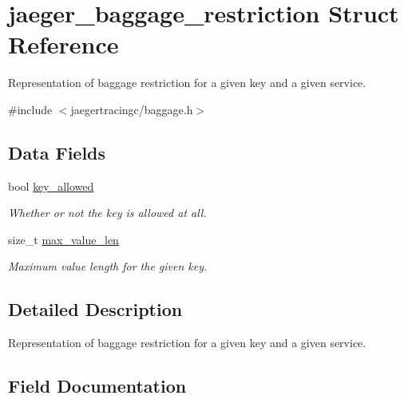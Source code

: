 \hypertarget{structjaeger__baggage__restriction}{}\section{jaeger\+\_\+baggage\+\_\+restriction Struct Reference}
\label{structjaeger__baggage__restriction}


Representation of baggage restriction for a given key and a given service.  




{\ttfamily \#include $<$jaegertracingc/baggage.\+h$>$}

\subsection*{Data Fields}
\begin{DoxyCompactItemize}
\item 
bool \mbox{\hyperlink{structjaeger__baggage__restriction_a0adda71667eefac438221ea727c5f1be}{key\+\_\+allowed}}
\begin{DoxyCompactList}\small\item\em Whether or not the key is allowed at all. \end{DoxyCompactList}\item 
size\+\_\+t \mbox{\hyperlink{structjaeger__baggage__restriction_a740265dd2c887da97c9682ae6b5be73d}{max\+\_\+value\+\_\+len}}
\begin{DoxyCompactList}\small\item\em Maximum value length for the given key. \end{DoxyCompactList}\end{DoxyCompactItemize}


\subsection{Detailed Description}
Representation of baggage restriction for a given key and a given service. 

\subsection{Field Documentation}
\mbox{\label{structjaeger__baggage__restriction_a0adda71667eefac438221ea727c5f1be}} 
